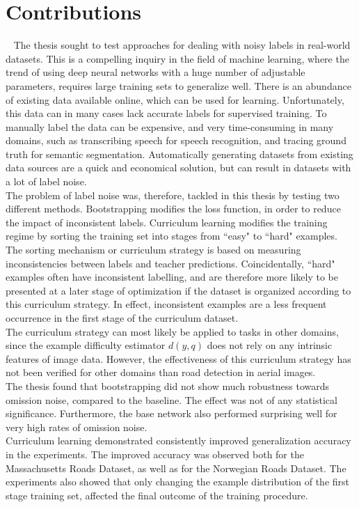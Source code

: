 \section{Contributions}~\label{cont}
\label{sec:Contributions}
The thesis sought to test approaches for dealing with noisy labels in real-world datasets. This is a compelling inquiry in the field of machine learning, where the trend of using deep neural networks with a huge number of adjustable parameters, requires large training sets to generalize well. There is an abundance of existing data available online, which can be used for learning. Unfortunately, this data can in many cases lack accurate labels for supervised training. To manually label the data can be expensive, and very time-consuming in many domains, such as transcribing speech for speech recognition, and tracing ground truth for semantic segmentation. Automatically generating datasets from existing data sources are a quick and economical solution, but can result in datasets with a lot of label noise.\\

The problem of label noise was, therefore, tackled in this thesis by testing two different methods. Bootstrapping modifies the loss function, in order to reduce the impact of inconsistent labels. Curriculum learning modifies the training regime by sorting the training set into stages from ``easy" to ``hard" examples. The sorting mechanism or curriculum strategy is based on measuring inconsistencies between labels and teacher predictions. Coincidentally, ``hard" examples often have inconsistent labelling, and are therefore more likely to be presented at a later stage of optimization if the dataset is organized according to this curriculum strategy. In effect, inconsistent examples are a less frequent occurrence in the first stage of the curriculum dataset.\\
 
The curriculum strategy can most likely be applied to tasks in other domains, since the example difficulty estimator $d(y,q)$ does not rely on any intrinsic features of image data. However, the effectiveness of this curriculum strategy has not been verified for other domains than road detection in aerial images.\\

The thesis found that bootstrapping did not show much robustness towards omission noise, compared to the baseline. The effect was not of any statistical significance. Furthermore, the base network also performed surprising well for very high rates of omission noise. \\

Curriculum learning demonstrated consistently improved generalization accuracy in the experiments. The improved accuracy was observed both for the Massachusetts Roads Dataset, as well as for the Norwegian Roads Dataset. The experiments also showed that only changing the example distribution of the first stage training set, affected the final outcome of the training procedure.\\


